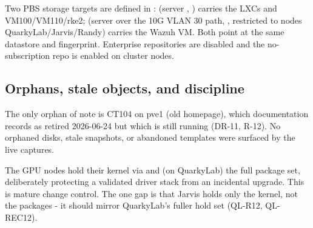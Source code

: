 Two PBS storage targets are defined in : 
(server , ) carries the LXCs and VM100/VM110/rke2;
 (server  over the 10G VLAN 30 path,
, restricted to nodes QuarkyLab/Jarvis/Randy) carries the
Wazuh VM. Both point at the same datastore and fingerprint. Enterprise repositories are
disabled and the no-subscription repo is enabled on cluster nodes.

\subsection{Orphans, stale objects, and discipline}

The only orphan of note is CT104 on pve1 (old homepage), which documentation records as
retired 2026-06-24 but which is still running (DR-11, R-12). No orphaned disks, stale
snapshots, or abandoned templates were surfaced by the live captures.

\begin{callout}[title=Strength: kernel-pin discipline]
The GPU nodes hold their kernel via  and (on QuarkyLab) the full
 package set, deliberately protecting a validated driver stack from an
incidental  upgrade. This is mature change control. The one gap is that Jarvis
holds only the kernel, not the  packages - it should mirror QuarkyLab's
fuller hold set (QL-R12, QL-REC12).
\end{callout}

